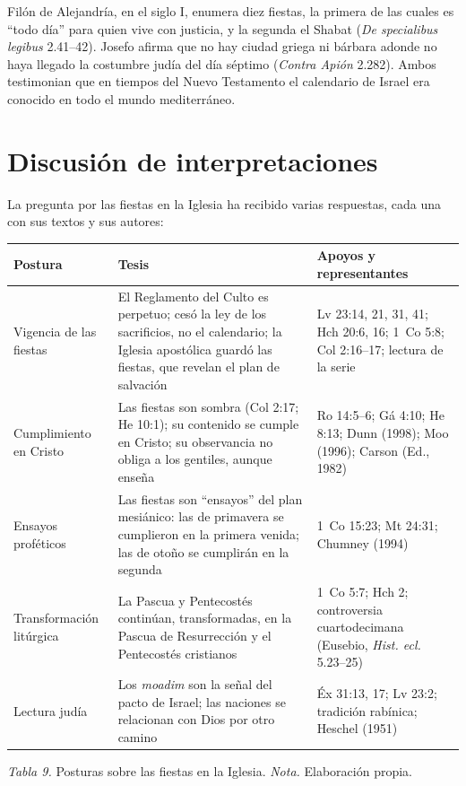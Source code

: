\documentclass[11pt,letterpaper]{article}
\begin{document}
Filón de Alejandría, en el siglo I, enumera diez fiestas, la primera de las cuales es ``todo día'' para quien vive con justicia, y la segunda el Shabat (\emph{De specialibus legibus} 2.41--42). Josefo afirma que no hay ciudad griega ni bárbara adonde no haya llegado la costumbre judía del día séptimo (\emph{Contra Apión} 2.282). Ambos testimonian que en tiempos del Nuevo Testamento el calendario de Israel era conocido en todo el mundo mediterráneo.

\section{Discusión de interpretaciones}\label{sec:discusion}

La pregunta por las fiestas en la Iglesia ha recibido varias respuestas, cada una con sus textos y sus autores:

\begin{center}\small\renewcommand{\arraystretch}{1.2}
\begin{tabular}{@{}L{3.1cm}L{6.6cm}L{5.5cm}@{}}
\toprule
\textbf{Postura} & \textbf{Tesis} & \textbf{Apoyos y representantes} \\ \midrule
Vigencia de las fiestas & El Reglamento del Culto es perpetuo; cesó la ley de los sacrificios, no el calendario; la Iglesia apostólica guardó las fiestas, que revelan el plan de salvación & Lv 23:14, 21, 31, 41; Hch 20:6, 16; 1~Co 5:8; Col 2:16--17; lectura de la serie \\
Cumplimiento en Cristo & Las fiestas son sombra (Col 2:17; He 10:1); su contenido se cumple en Cristo; su observancia no obliga a los gentiles, aunque enseña & Ro 14:5--6; Gá 4:10; He 8:13; Dunn (1998); Moo (1996); Carson (Ed., 1982) \\
Ensayos proféticos & Las fiestas son ``ensayos'' del plan mesiánico: las de primavera se cumplieron en la primera venida; las de otoño se cumplirán en la segunda & 1~Co 15:23; Mt 24:31; Chumney (1994) \\
Transformación litúrgica & La Pascua y Pentecostés continúan, transformadas, en la Pascua de Resurrección y el Pentecostés cristianos & 1~Co 5:7; Hch 2; controversia cuartodecimana (Eusebio, \emph{Hist. ecl.} 5.23--25) \\
Lectura judía & Los \emph{moadim} son la señal del pacto de Israel; las naciones se relacionan con Dios por otro camino & Éx 31:13, 17; Lv 23:2; tradición rabínica; Heschel (1951) \\
\bottomrule
\end{tabular}\par
{\footnotesize\color{sepia}\textit{Tabla 9.} Posturas sobre las fiestas en la Iglesia. \textit{Nota.} Elaboración propia.}
\end{center}
\end{document}
